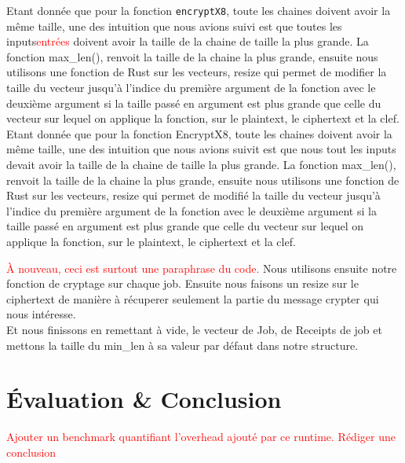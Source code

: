 \documentclass{article}
\newcommand{\TODO}[1]{\textcolor{red}{#1}}
\begin{document}

Etant donnée que pour la fonction \lstinline!encryptX8!, toute les chaines doivent avoir la même taille, une des intuition que nous avions suivi est que toutes les inputs\TODO{entrées} doivent avoir la taille de la chaine de taille la plus grande. La fonction max\_len(), renvoit la taille de la chaine la plus grande, ensuite nous utilisons une fonction de Rust sur les vecteurs, resize qui permet de modifier la taille du vecteur jusqu'à l'indice du première argument de la fonction avec le deuxième argument si la taille passé en argument est plus grande que celle du vecteur sur lequel on applique la fonction, sur le plaintext, le ciphertext et la clef.\\

Etant donnée que pour la fonction EncryptX8, toute les chaines doivent avoir la même taille, une des intuition que nous avions suivit est que nous tout les inputs devait avoir la taille de la chaine de taille la plus grande. La fonction max\_len(), renvoit la taille de la chaine la plus grande, ensuite nous utilisons une fonction de Rust sur les vecteurs, resize qui permet de modifié la taille du vecteur jusqu'à l'indice du première argument de la fonction avec le deuxième argument si la taille passé en argument est plus grande que celle du vecteur sur lequel on applique la fonction, sur le plaintext, le ciphertext et la clef. 

\TODO{À nouveau, ceci est surtout une paraphrase du code.}
Nous utilisons ensuite notre fonction de cryptage sur chaque job. Ensuite nous faisons un resize sur le ciphertext de manière à récuperer seulement la partie du message crypter qui nous intéresse.\\
Et nous finissons en remettant à vide, le vecteur de Job, de Receipts de job et mettons la taille du min\_len à sa valeur par défaut dans notre structure.


\section{Évaluation \& Conclusion}

\TODO{Ajouter un benchmark quantifiant l'overhead ajouté par ce runtime.}
\TODO{Rédiger une conclusion}
\end{document}
